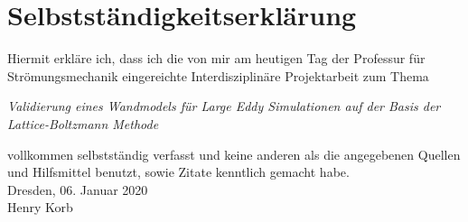 \cleardoublepage
\chapter*{Selbstständigkeitserklärung}
\thispagestyle{empty}
Hiermit erkläre ich, dass ich die von mir am heutigen Tag der Professur für Strömungsmechanik eingereichte 
Interdisziplinäre Projektarbeit 
zum Thema 
\begin{center}
\textit{Validierung eines Wandmodels für Large Eddy Simulationen auf der Basis der Lattice-Boltzmann Methode}
\end{center}
vollkommen selbstständig verfasst und keine anderen als die angegebenen Quellen und Hilfsmittel benutzt, sowie Zitate kenntlich gemacht habe.
\\[10mm]
Dresden, 06. Januar 2020 \\[1cm]
Henry Korb
